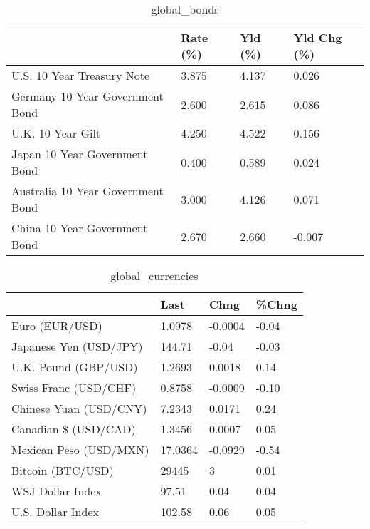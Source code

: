 \documentclass{article}%
\begin{document}
%


\begin{table}[htbp]%
\caption{global\_bonds}%
\centering%
\begin{adjustbox}{width=1\textwidth}%
\begin{tabular}{llll}
\toprule
                                  & Rate (\%) & Yld (\%) & Yld Chg (\%) \\
\midrule
       U.S. 10 Year Treasury Note &    3.875 &   4.137 &       0.026 \\
  Germany 10 Year Government Bond &    2.600 &   2.615 &       0.086 \\
                U.K. 10 Year Gilt &    4.250 &   4.522 &       0.156 \\
    Japan 10 Year Government Bond &    0.400 &   0.589 &       0.024 \\
Australia 10 Year Government Bond &    3.000 &   4.126 &       0.071 \\
    China 10 Year Government Bond &    2.670 &   2.660 &      -0.007 \\
\bottomrule
\end{tabular}
%
\end{adjustbox}%
\end{table}

%


\begin{table}[htbp]%
\caption{global\_currencies}%
\centering%
\begin{adjustbox}{width=1\textwidth}%
\begin{tabular}{llll}
\toprule
                       &    Last &    Chng & \%Chng \\
\midrule
        Euro (EUR/USD) &  1.0978 & -0.0004 & -0.04 \\
Japanese Yen (USD/JPY) &  144.71 &   -0.04 & -0.03 \\
  U.K. Pound (GBP/USD) &  1.2693 &  0.0018 &  0.14 \\
 Swiss Franc (USD/CHF) &  0.8758 & -0.0009 & -0.10 \\
Chinese Yuan (USD/CNY) &  7.2343 &  0.0171 &  0.24 \\
  Canadian \$ (USD/CAD) &  1.3456 &  0.0007 &  0.05 \\
Mexican Peso (USD/MXN) & 17.0364 & -0.0929 & -0.54 \\
     Bitcoin (BTC/USD) &   29445 &       3 &  0.01 \\
      WSJ Dollar Index &   97.51 &    0.04 &  0.04 \\
     U.S. Dollar Index &  102.58 &    0.06 &  0.05 \\
\bottomrule
\end{tabular}
%
\end{adjustbox}%
\end{table}
\end{document}
